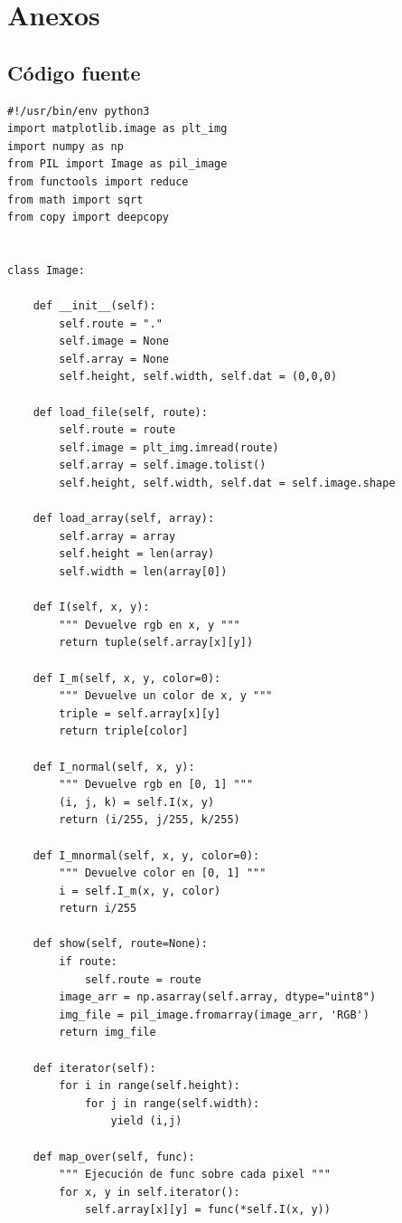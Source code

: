 \documentclass[letter]{article}
\begin{document}
\section{Anexos}
\label{sec:org30d72a7}
\subsection{Código fuente}
\label{sec:org7fb1bd7}
\begin{verbatim}
#!/usr/bin/env python3
import matplotlib.image as plt_img
import numpy as np
from PIL import Image as pil_image
from functools import reduce
from math import sqrt
from copy import deepcopy


class Image:

    def __init__(self):
        self.route = "."
        self.image = None
        self.array = None
        self.height, self.width, self.dat = (0,0,0)

    def load_file(self, route):
        self.route = route
        self.image = plt_img.imread(route)
        self.array = self.image.tolist()
        self.height, self.width, self.dat = self.image.shape

    def load_array(self, array):
        self.array = array
        self.height = len(array)
        self.width = len(array[0])

    def I(self, x, y):
        """ Devuelve rgb en x, y """
        return tuple(self.array[x][y])

    def I_m(self, x, y, color=0):
        """ Devuelve un color de x, y """
        triple = self.array[x][y]
        return triple[color]

    def I_normal(self, x, y):
        """ Devuelve rgb en [0, 1] """
        (i, j, k) = self.I(x, y)
        return (i/255, j/255, k/255)

    def I_mnormal(self, x, y, color=0):
        """ Devuelve color en [0, 1] """
        i = self.I_m(x, y, color)
        return i/255

    def show(self, route=None):
        if route:
            self.route = route
        image_arr = np.asarray(self.array, dtype="uint8")
        img_file = pil_image.fromarray(image_arr, 'RGB')
        return img_file

    def iterator(self):
        for i in range(self.height):
            for j in range(self.width):
                yield (i,j)

    def map_over(self, func):
        """ Ejecución de func sobre cada pixel """
        for x, y in self.iterator():
            self.array[x][y] = func(*self.I(x, y))


\end{verbatim}
\end{document}

